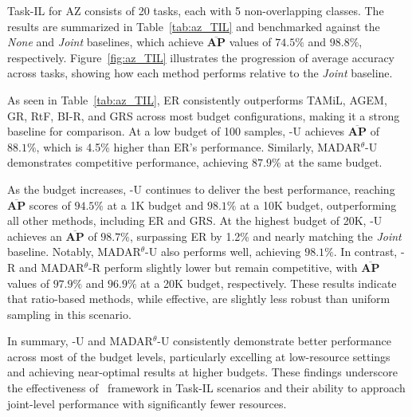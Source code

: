 

Task-IL for AZ consists of 20 tasks, each with 5 non-overlapping classes. The results are summarized in Table~\ref{tab:az_TIL} and benchmarked against the \textit{None} and \textit{Joint} baselines, which achieve $\mathbf{\overline{AP}}$ values of $74.5\%$ and $98.8\%$, respectively. Figure~\ref{fig:az_TIL} illustrates the progression of average accuracy across tasks, showing how each method performs relative to the \textit{Joint} baseline.

As seen in Table~\ref{tab:az_TIL}, ER consistently outperforms TAMiL, AGEM, GR, RtF, BI-R, and GRS across most budget configurations, making it a strong baseline for comparison. At a low budget of 100 samples, \system-U achieves $\mathbf{\overline{AP}}$ of $88.1\%$, which is 4.5\% higher than ER's performance. Similarly, MADAR$^\theta$-U demonstrates competitive performance, achieving $87.9\%$ at the same budget.

As the budget increases, \system-U continues to deliver the best performance, reaching $\mathbf{\overline{AP}}$ scores of $94.5\%$ at a 1K budget and $98.1\%$ at a 10K budget, outperforming all other methods, including ER and GRS. At the highest budget of 20K, \system-U achieves an $\mathbf{\overline{AP}}$ of $98.7\%$, surpassing ER by 1.2\% and nearly matching the \textit{Joint} baseline. Notably, MADAR$^\theta$-U also performs well, achieving $98.1\%$. In contrast, \system-R and MADAR$^\theta$-R perform slightly lower but remain competitive, with $\mathbf{\overline{AP}}$ values of $97.9\%$ and $96.9\%$ at a 20K budget, respectively. These results indicate that ratio-based methods, while effective, are slightly less robust than uniform sampling in this scenario.

In summary, \system-U and MADAR$^\theta$-U consistently demonstrate better performance across most of the budget levels, particularly excelling at low-resource settings and achieving near-optimal results at higher budgets. These findings underscore the effectiveness of \system\ framework in Task-IL scenarios and their ability to approach joint-level performance with significantly fewer resources.


